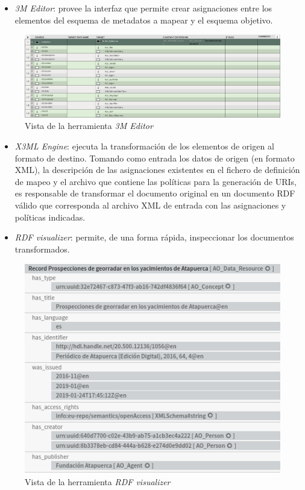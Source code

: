 \documentclass[
]{article}
\providecommand{\tightlist}{%
  \setlength{\itemsep}{0pt}\setlength{\parskip}{0pt}}
\begin{document}
\begin{itemize}
\tightlist
\item
  \emph{3M Editor}: provee la interfaz que permite crear asignaciones
  entre los elementos del esquema de metadatos a mapear y el esquema
  objetivo.
\end{itemize}

\begin{figure}
\hypertarget{3meditor}{%
\centering
\includegraphics{../_static/images/3meditor.png}
\caption{Vista de la herramienta \emph{3M Editor}}\label{3meditor}
}
\end{figure}

\begin{itemize}
\tightlist
\item
  \emph{X3ML Engine}: ejecuta la transformación de los elementos de
  origen al formato de destino. Tomando como entrada los datos de origen
  (en formato XML), la descripción de las asignaciones existentes en el
  fichero de definición de mapeo y el archivo que contiene las políticas
  para la generación de URIs, es responsable de transformar el documento
  original en un documento RDF válido que corresponda al archivo XML de
  entrada con las asignaciones y políticas indicadas.
\item
  \emph{RDF visualizer}: permite, de una forma rápida, inspeccionar los
  documentos transformados.
\end{itemize}

\begin{figure}
\hypertarget{rdfvisualizer}{%
\centering
\includegraphics{../_static/images/rdfvisualizer.png}
\caption{Vista de la herramienta \emph{RDF
visualizer}}\label{rdfvisualizer}
}
\end{figure}
\end{document}
